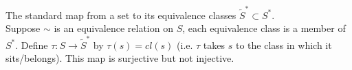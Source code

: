 \begin{example}
The standard map from a set to its equivalence classes $\tilde{S}^*\subset S^*$.\\ 
Suppose $\sim$ is an equivalence relation on $S$, each equivalence class is a member of $S^*$. Define $\tau:S\rightarrow \tilde{S}^*$ by $\tau(s)=cl(s)$ (i.e. $\tau$ takes $s$ to the class in which it sits/belongs). This map is surjective but not injective.
\end{example}
